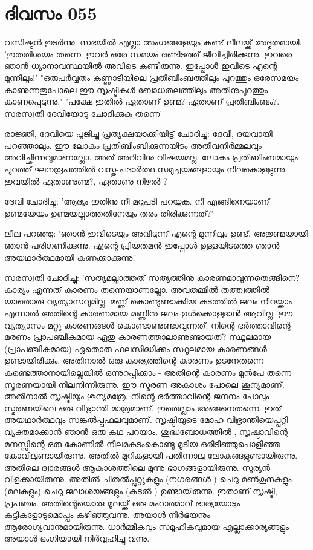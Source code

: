 \newpage
\section{ദിവസം 055}


വസിഷ്ഠന്‍ തുടര്‍ന്നു: സഭയില്‍ എല്ലാ അംഗങ്ങളേയും കണ്ട്‌ ലീലയ്ക്ക്‌ അദ്ഭുതമായി. 'ഇതതിശയം തന്നെ. ഇവര്‍ ഒരേ സമയം രണ്ടിടത്ത്‌ ജീവിച്ചിരിക്കുന്നു. ഇവരെ ഞാന്‍ ധ്യാനാവസ്ഥയില്‍ അവിടെ കണ്ടിരുന്നു. ഇപ്പോള്‍ ഇവിടെ എന്റെ മുന്നിലൂം!' "ഒരുപര്‍വ്വതം കണ്ണാടിയിലെ പ്രതിബിംബത്തിലും പുറത്തും ഒരേസമയം കാണുന്നതുപോലെ ഈ സൃഷ്ടികള്‍ ബോധതലത്തിലും അതിനുപുറത്തും കാണപ്പെടുന്നു." 'പക്ഷേ ഇതില്‍ ഏതാണ്‌ ഉണ്മ? ഏതാണ്‌ പ്രതിബിംബം?. സരസ്വതീ ദേവിയോടു ചോദിക്കുക തന്നെ'

രാജ്ഞി, ദേവിയെ പൂജിച്ചു പ്രത്യക്ഷയാക്കിയിട്ട്‌ ചോദിച്ചു: ദേവീ, ദയവായി പറഞ്ഞാലും. ഈ ലോകം പ്രതിബിംബിക്കുന്നയിടം അതീവനിര്‍മ്മലവും അവിച്ഛിന്നവുമാണല്ലോ. അത്‌ അറിവിനു വിഷയമല്ല. ലോകം പ്രതിബിംബമായും പുറത്ത്‌ ഘനരൂപത്തില്‍ വസ്തു-പദാര്‍ത്ഥ സമുച്ചയങ്ങളായും നിലകൊള്ളുന്നു. ഇവയില്‍ ഏതാണുണ്മ?, ഏതാണു നിഴല്‍ ?

ദേവി ചോദിച്ചു: 'ആദ്യം ഇതിനു നീ മറുപടി പറയുക. നീ എങ്ങിനെയാണ്‌ ഉണ്മയേയും ഉണ്മയല്ലാത്തതിനേയും തരം തിരിക്കുന്നത്‌?'

ലീല പറഞ്ഞു: 'ഞാന്‍ ഇവിടെയും അവിടുന്ന് എന്റെ മുന്നിലും ഉണ്ട്‌. അതുണ്മയായി ഞാന്‍ പരിഗണിക്കുന്നു. എന്റെ പ്രിയതമന്‍ ഇപ്പോള്‍ ഉള്ളയിടത്തെ ഞാന്‍ അയഥാര്‍ത്ഥമായി കണക്കാക്കുന്നു.'

സരസ്വതി ചോദിച്ചു: 'സത്യമല്ലാത്തത്‌ സത്യത്തിനു കാരണമാവുന്നതെങ്ങിനെ? കാര്യം എന്നത്‌ കാരണം തന്നെയാണല്ലോ. അവതമ്മില്‍ തത്ത്വത്തില്‍ യാതൊരു വ്യത്യാസവുമില്ല. മണ്ണ് കൊണ്ടുണ്ടാക്കിയ കുടത്തില്‍ ജലം നിറയ്ക്കാം എന്നാല്‍ അതിന്റെ കാരണമായ മണ്ണിനു ജലം ഉള്‍ക്കൊള്ളാന്‍ ആവില്ല. ഈ വ്യത്യാസം മറ്റു കാരണങ്ങള്‍ കൊണ്ടാണുണ്ടാവുന്നത്‌. നിന്റെ ഭര്‍ത്താവിന്റെ മരണം പ്രാപഞ്ചികമായ ഏതു കാരണത്താലാണുണ്ടായത്‌? സ്ഥൂലമായ (പ്രാപഞ്ചികമായ) ഏതൊരു ഫലസിദ്ധിക്കും സ്ഥൂലമായ കാരണങ്ങള്‍ ഉണ്ടായിരിക്കും. അതിനാല്‍ ഒരു കാര്യത്തിന്റെ കാരണം ഉടനേതന്നെ കണ്ടെത്താനായില്ലെങ്കില്‍ ഒന്നുറപ്പിക്കാം - അതിന്റെ കാരണം മുന്‍പേ തന്നെ സ്മരണയായി നിലനിന്നിരുന്നു. ഈ സ്മരണ അകാശം പോലെ ശൂന്യമാണ്‌. അതിനാല്‍ സൃഷ്ടിയും ശൂന്യമത്രേ. നിന്റെ ഭര്‍ത്താവിന്റെ ജനനം പോലും സ്മരണയിലെ ഒരു വിഭ്രാന്തി മാത്രമാണ്‌. ഇതെല്ലാം അങ്ങനെതന്നെ. ഇത്‌ അയഥാര്‍ത്ഥവും സങ്കല്‍പ്പഫലവുമാണ്‌. സൃഷ്ടിയുടെ മോഹ വിഭ്രാന്തിയെപ്പറ്റി വ്യക്തമാക്കാന്‍ ഞാന്‍ ഒരു കഥ പറയാം. ശുദ്ധബോധത്തില്‍ , സൃഷ്ടാവിന്റെ മനസ്സിന്റെ ഒരു കോണില്‍ നീലമകുടംകൊണ്ടു മൂടിയ ഒരിടിഞ്ഞുപൊളിഞ്ഞ കോവിലുണ്ടായിരുന്നു. അതില്‍ മുറികളായി പതിന്നാലു ലോകങ്ങളുണ്ടായിരുന്നു. അതിലെ ദ്വാരങ്ങള്‍ ആകാശത്തിലെ മൂന്നു ഭാഗങ്ങളായിരുന്നു. സൂര്യന്‍ വിളക്കായിരുന്നു. അതില്‍ ചിതല്‍പ്പുറ്റുകളും (നഗരങ്ങള്‍ ) ചെറു മണ്‍കൂനകളും (മലകളും) ചെറു ജലാശയങ്ങളും (കടല്‍ ) ഉണ്ടായിരുന്നു. ഇതാണ്‌ സൃഷ്ടി; പ്രപഞ്ചം. അതിന്റെയൊരു മൂലയ്ക്ക്‌ ഒരു മഹാത്മാവ്‌ ഭാര്യയോടും കുട്ടികളോടുമൊപ്പം കഴിഞ്ഞുവന്നു. അയാള്‍ നിര്‍ഭയനും ആരോഗ്യവാനുമായിരുന്നു. ധാര്‍മ്മീകവും സമൂഹികവുമായ എല്ലാക്കാര്യങ്ങളും അയാള്‍ ഭംഗിയായി നിര്‍വ്വഹിച്ചു വന്നു.
